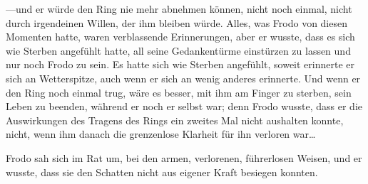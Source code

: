 —und er würde den Ring nie mehr abnehmen können, nicht noch einmal, nicht durch irgendeinen Willen, der ihm bleiben würde. Alles, was Frodo von diesen Momenten hatte, waren verblassende Erinnerungen, aber er wusste, dass es sich wie Sterben angefühlt hatte, all seine Gedankentürme einstürzen zu lassen und nur noch Frodo zu sein. Es hatte sich wie Sterben angefühlt, soweit erinnerte er sich an Wetterspitze, auch wenn er sich an wenig anderes erinnerte. Und wenn er den Ring noch einmal trug, wäre es besser, mit ihm am Finger zu sterben, sein Leben zu beenden, während er noch er selbst war; denn Frodo wusste, dass er die Auswirkungen des Tragens des Rings ein zweites Mal nicht aushalten konnte, nicht, wenn ihm danach die grenzenlose Klarheit für ihn verloren war…

Frodo sah sich im Rat um, bei den armen, verlorenen, führerlosen Weisen, und er wusste, dass sie den Schatten nicht aus eigener Kraft besiegen konnten.

